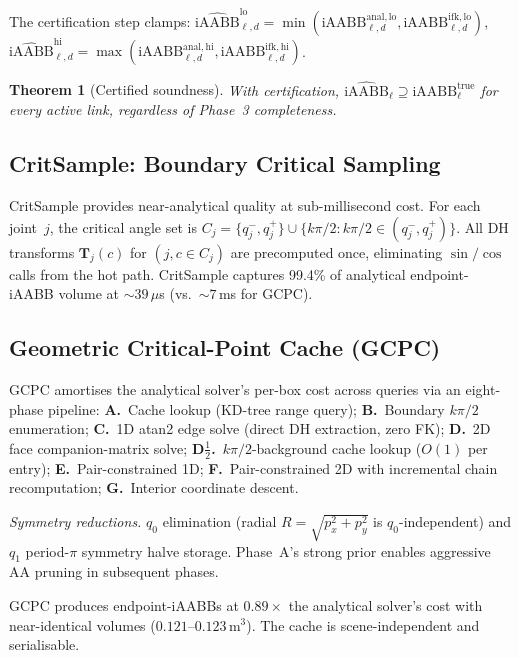 \documentclass[journal]{IEEEtran}
\newtheorem{theorem}{Theorem}
\newcommand{\iAABB}{\text{iAABB}}
\newcommand{\bT}{\mathbf{T}}
\begin{document}
The certification step clamps:
$\widehat{\iAABB}_{\ell,d}^{\mathrm{lo}}
= \min(\iAABB_{\ell,d}^{\mathrm{anal,lo}},
       \iAABB_{\ell,d}^{\mathrm{ifk,lo}})$,
$\widehat{\iAABB}_{\ell,d}^{\mathrm{hi}}
= \max(\iAABB_{\ell,d}^{\mathrm{anal,hi}},
       \iAABB_{\ell,d}^{\mathrm{ifk,hi}})$.

\begin{theorem}[Certified soundness]\label{thm:cert_sound}
With certification, $\widehat{\iAABB}_\ell \supseteq
\iAABB^{\mathrm{true}}_\ell$ for every active link,
regardless of Phase~3 completeness.
\end{theorem}

\subsection{CritSample: Boundary Critical Sampling}\label{sec:critsample}

CritSample provides near-analytical quality at sub-millisecond cost.
For each joint~$j$, the critical angle set is
$C_j = \{q_j^-, q_j^+\} \cup \{k\pi/2 : k\pi/2 \in (q_j^-, q_j^+)\}$.
All DH transforms $\bT_j(c)$ for $(j, c \in C_j)$ are precomputed
once, eliminating $\sin/\cos$ calls from the hot path.
CritSample captures 99.4\% of analytical endpoint-iAABB volume at
${\sim}39\,\mu$s (vs.\ ${\sim}7\,$ms for GCPC).

\subsection{Geometric Critical-Point Cache (GCPC)}\label{sec:gcpc}

GCPC amortises the analytical solver's per-box cost across queries via
an eight-phase pipeline:
\textbf{A.}~Cache lookup (KD-tree range query);
\textbf{B.}~Boundary $k\pi/2$ enumeration;
\textbf{C.}~1D atan2 edge solve (direct DH extraction, zero FK);
\textbf{D.}~2D face companion-matrix solve;
\textbf{D$\frac{1}{2}$.}~$k\pi/2$-background cache lookup ($O(1)$ per entry);
\textbf{E.}~Pair-constrained 1D;
\textbf{F.}~Pair-constrained 2D with incremental chain recomputation;
\textbf{G.}~Interior coordinate descent.

\emph{Symmetry reductions.}
$q_0$ elimination (radial $R = \sqrt{p_x^2+p_y^2}$ is $q_0$-independent)
and $q_1$ period-$\pi$ symmetry halve storage.
Phase~A's strong prior enables aggressive AA pruning in subsequent phases.

GCPC produces endpoint-iAABBs at $0.89{\times}$ the analytical solver's
cost with near-identical volumes ($0.121$--$0.123\,$m$^3$).
The cache is scene-independent and serialisable.
\end{document}
